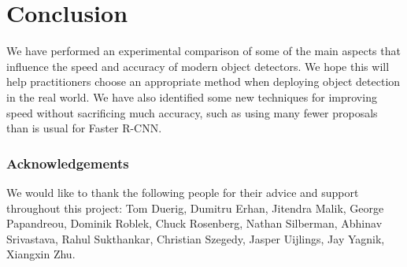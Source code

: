 \documentclass[10pt,twocolumn,letterpaper]{article}
\newcommand{\eat}[1]{}
\begin{document}
  
 
  

  \section{Conclusion}
\label{sec:concl}

We have performed an experimental comparison of some of the main
aspects that influence the speed and accuracy of modern object
detectors. We hope this will help practitioners choose an appropriate
method when deploying object detection in the real world.
We have also identified some new techniques for improving speed
without sacrificing much accuracy, such as using many fewer proposals
than is usual for Faster R-CNN.



\eat{ 

Some limitations of this study
+ limited to the meta-architectures that we have studied
+ some of our conclusions are likely to be closely tied to specific choices made for selecting anchors.

The factors that pay off the most in improving accuracy seems to be...
}
 





\subsubsection*{Acknowledgements}\vspace{-3mm}
{\footnotesize
We would like to thank the following people
for their advice and support throughout this project: 
Tom Duerig, Dumitru Erhan, Jitendra Malik, George Papandreou, Dominik Roblek,
Chuck Rosenberg, Nathan Silberman, Abhinav Srivastava, Rahul Sukthankar,
Christian Szegedy, Jasper Uijlings, Jay Yagnik, Xiangxin Zhu.
}

{\small


}
\end{document}
